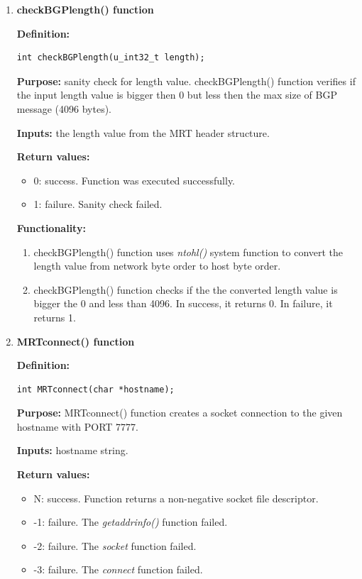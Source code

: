 \begin{enumerate}
\begin{enumerate}
\end{enumerate}




\item{\textbf{checkBGPlength() function} }

\textbf{Definition:}  
\begin{verbatim}
int checkBGPlength(u_int32_t length);
\end{verbatim}

\textbf{Purpose:}  sanity check for length value.  checkBGPlength() function verifies if the input  length value is bigger then 0 but less then the max size of BGP message (4096 bytes).

\textbf{Inputs:} the length value from the MRT header structure.

\textbf{Return values:}
\begin{itemize}
\item{0: success. Function was executed successfully. }
\item{1: failure. Sanity check failed.}
\end{itemize} 

\textbf{Functionality:}

\begin{enumerate}
\item{checkBGPlength() function uses \emph{ntohl()} system function to convert the length value from  network byte order to host byte order.}
\item{checkBGPlength() function checks if the the converted length value is bigger the 0 and less than 4096. In success, it returns 0. In failure, it returns 1.}
\end{enumerate}

\item{\textbf{MRTconnect() function} }

\textbf{Definition:}  
\begin{verbatim}
int MRTconnect(char *hostname);
\end{verbatim}

\textbf{Purpose:}  MRTconnect() function creates a socket connection to the given hostname with PORT 7777.

\textbf{Inputs:} hostname string.

\textbf{Return values:}
\begin{itemize}
\item{N:  success. Function returns a non-negative socket file descriptor.}
\item{-1: failure. The \emph{getaddrinfo()} function failed.}
\item{-2: failure. The \emph{socket} function failed.} 
\item{-3: failure. The \emph{connect} function failed.}
\end{itemize} 




\end{enumerate}
